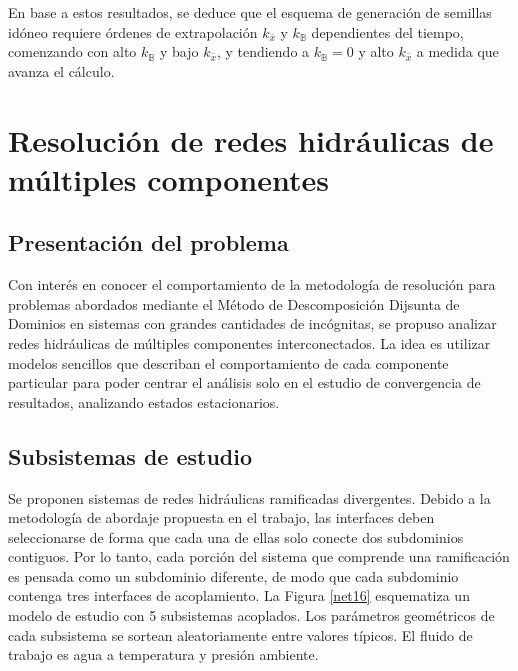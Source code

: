 En base a estos resultados, se deduce que el esquema de generación de semillas idóneo
requiere órdenes de extrapolación $k_{\bar{x}}$ y $k_{\mathbb{B}}$ dependientes del tiempo,
comenzando con alto $k_{\mathbb{B}}$ y bajo $k_{\bar{x}}$, y tendiendo a $k_{\mathbb{B}}=0$ y alto $k_{\bar{x}}$ a medida que avanza el cálculo.

\section{Resolución de redes hidráulicas de múltiples componentes}
\label{3:redes}

\subsection*{Presentación del problema}
\label{3:redes-presentacion}

Con interés en conocer el comportamiento de la metodología de resolución
para problemas abordados mediante el Método de Descomposición Dijsunta de Dominios en sistemas con grandes cantidades de incógnitas,
se propuso analizar redes hidráulicas de múltiples componentes interconectados.
La idea es utilizar modelos sencillos que describan el comportamiento de cada componente particular para poder centrar el análisis solo en el estudio de convergencia
de resultados, analizando estados estacionarios.

\subsection*{Subsistemas de estudio}
\label{3:redes-subsistemas}

Se proponen sistemas de redes hidráulicas ramificadas divergentes.
Debido a la metodología de abordaje propuesta en el trabajo, las interfaces deben seleccionarse de forma que cada una de ellas solo conecte dos subdominios contiguos.
Por lo tanto, cada porción del sistema que comprende una ramificación es pensada como un subdominio diferente,
de modo que cada subdominio contenga tres interfaces de acoplamiento.
La Figura \ref{net16} esquematiza un modelo de estudio con 5 subsistemas acoplados.
Los parámetros geométricos de cada subsistema se sortean aleatoriamente entre valores típicos.
El fluido de trabajo es agua a temperatura y presión ambiente.

